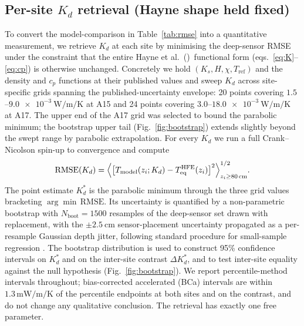 \documentclass[11pt]{article}
\newcommand{\Hayne}{Hayne et al.\ (\citeyear{hayne2017})}
\newcommand{\zborestem}{80\,\si{\centi\meter}}
\begin{document}
\subsection{Per-site $K_d$ retrieval (Hayne shape held fixed)}\label{sec:methods-kd}
To convert the model-comparison in Table~\ref{tab:rmse} into a
quantitative measurement, we retrieve $K_d$ at each site by minimising
the deep-sensor RMSE under the constraint that the entire
\Hayne\ functional form (eqs.~\ref{eq:K}--\ref{eq:cp}) is otherwise
unchanged. Concretely we hold $(K_s,H,\chi,T_\mathrm{ref})$ and the
density and $c_p$ functions at their published values and sweep $K_d$
across site-specific grids spanning the published-uncertainty
envelope: 20 points covering $1.5$--$\SI{9.0e-3}{\watt\per\meter\per\kelvin}$ at A15
and 24 points covering $3.0$--$\SI{18.0e-3}{\watt\per\meter\per\kelvin}$ at A17.
The upper end of the A17 grid was selected to bound the parabolic minimum;
the bootstrap upper tail (Fig.~\ref{fig:bootstrap}) extends slightly beyond
the swept range by parabolic extrapolation. For
every $K_d$ we run a full Crank--Nicolson spin-up to convergence and
compute
\begin{equation}
\mathrm{RMSE}(K_d) = \Bigl\langle\bigl[T_\mathrm{model}(z_i;K_d) - T_\mathrm{eq}^\mathrm{HFE}(z_i)\bigr]^2\Bigr\rangle_{z_i\ge\zborestem}^{1/2}.
\label{eq:rmse-kd}
\end{equation}
The point estimate $K_d^{*}$ is the parabolic minimum through the three
grid values bracketing $\arg\min\,\mathrm{RMSE}$. Its uncertainty is
quantified by a non-parametric bootstrap with $N_\mathrm{boot}=1500$
resamples of the deep-sensor set drawn with replacement, with the
$\pm\SI{2.5}{\centi\meter}$ sensor-placement uncertainty
\citep{nagihara2018} propagated as a per-resample Gaussian depth
jitter, following standard procedure for small-sample regression
\citep{press2007}. The bootstrap distribution is used to construct
95\% confidence intervals on $K_d^{*}$ and on the inter-site contrast
$\Delta K_d^{*}$, and to test inter-site equality against the null
hypothesis (Fig.~\ref{fig:bootstrap}). We report percentile-method
intervals throughout; bias-corrected accelerated (BCa) intervals
\citep{efron1993} are within $1.3\,\si{\milli\watt\per\meter\per\kelvin}$
of the percentile endpoints at both sites and on the contrast, and
do not change any qualitative conclusion. The retrieval has exactly
one free parameter.
\end{document}
